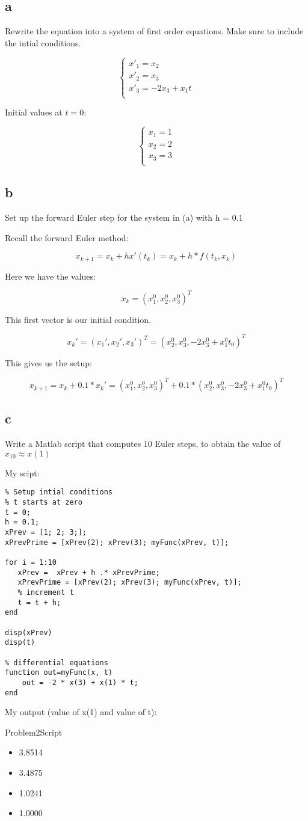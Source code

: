 \documentclass[]{article}
\begin{document}
\subsection{a}\label{a}

Rewrite the equation into a system of first order equations. Make sure
to include the intial conditions.

\[
\begin{cases} 
      x'_1 = x_2 \\
      x'_2 = x_3 \\
      x'_3 = -2x_3 + x_1t\\  
\end{cases}
\]

Initial values at \(t = 0\):

\[
\begin{cases} 
      x_1 = 1 \\
      x_2 = 2 \\
      x_3 = 3 \\
\end{cases}
\]

\subsection{b}\label{b}

Set up the forward Euler step for the system in (a) with h = 0.1

Recall the forward Euler method:

\[x_{k+1} = x_k + hx'(t_k) = x_k + h*f(t_k,x_k)\]

Here we have the values:

\[x_k = (x_1^0, x_2^0, x_3^0)^T\]

This first vector is our initial condition.

\[x_k' = (x_1', x_2',x_3')^T = (x_2^0, x_3^0, -2x_3^0+x_1^0t_0)^T\]

This gives us the setup:

\[x_{k+1} = x_k + 0.1 * x_k' = (x_1^0, x_2^0, x_3^0)^T + 0.1 * (x_2^0, x_3^0, -2x_3^0+x_1^0t_0)^T\]

\subsection{c}\label{c-1}

Write a Matlab script that computes 10 Euler steps, to obtain the value
of \(x_10 \approx x(1)\)

My scipt:

\begin{verbatim}
% Setup intial conditions
% t starts at zero
t = 0;
h = 0.1;
xPrev = [1; 2; 3;];
xPrevPrime = [xPrev(2); xPrev(3); myFunc(xPrev, t)];

for i = 1:10
   xPrev =  xPrev + h .* xPrevPrime;
   xPrevPrime = [xPrev(2); xPrev(3); myFunc(xPrev, t)];
   % increment t
   t = t + h;
end

disp(xPrev)
disp(t)

% differential equations
function out=myFunc(x, t) 
    out = -2 * x(3) + x(1) * t;
end
\end{verbatim}

My output (value of x(1) and value of t):

Problem2Script

\begin{itemize}
\item
  3.8514
\item
  3.4875
\item
  1.0241
\item
  1.0000
\end{itemize}
\end{document}
